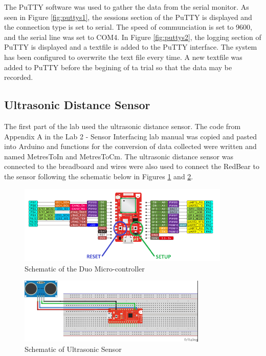 \documentclass[11pt]{article}
\begin{document}
The PuTTY software was used to gather the data from the serial monitor. As seen in Figure \ref{fig:puttys1}, the sessions section of the PuTTY is displayed and the connection type is set to serial. The speed of communciation is set to 9600, and the serial line was set to {\selectfont COM4}. In Figure \ref{fig:puttys2}, the logging section of PuTTY is displayed and a textfile is added to the PuTTY interface. The system has been configured to overwrite the text file every time. A new textfile was added to PuTTY before the begining of ta trial so that the data may be recorded. 

\subsection{Ultrasonic Distance Sensor}

The first part of the lab used the ultrasonic distance sensor. The code from Appendix A in the Lab 2 - Sensor Interfacing lab manual was copied and pasted into Arduino and functions for the conversion of data collected were written and named {\selectfont MetresToIn} and {\selectfont MetresToCm}. The ultrasonic distance sensor was connected to the breadboard and wires were also used to connect the RedBear to the sensor following the schematic below in Figures \ref{fig:schematic} and \ref{fig:sch_sonic}.\\


\begin{figure}[!ht]
    \centering
    \includegraphics[width=0.90\textwidth]{pics/schematic.PNG}
    \caption{Schematic of the Duo Micro-controller}
    \label{fig:schematic}
\end{figure}

\begin{figure}[!ht]
    \centering
    \includegraphics[width=0.8\textwidth]{pics/UltrasonicSensor.jpg}
    \caption{Schematic of Ultrasonic Sensor}
    \label{fig:sch_sonic}
\end{figure}
\end{document}
